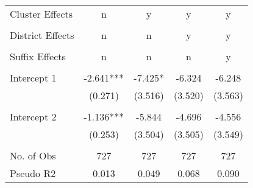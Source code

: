 \begin{tabular}{lcccc}
  Cluster Effects &                                 n &                                 y &                                 y &                                 y \\
                  &                                   &                                   &                                   &                                   \\
 District Effects &                                 n &                                 n &                                 y &                                 y \\
                  &                                   &                                   &                                   &                                   \\
   Suffix Effects &                                 n &                                 n &                                 n &                                 y \\
                  &                                   &                                   &                                   &                                   \\
      Intercept 1 &                         -2.641*** &                           -7.425* &                            -6.324 &                            -6.248 \\
                  &                           (0.271) &                           (3.516) &                           (3.520) &                           (3.563) \\
                  &                                   &                                   &                                   &                                   \\
      Intercept 2 &                         -1.136*** &                            -5.844 &                            -4.696 &                            -4.556 \\
                  &                           (0.253) &                           (3.504) &                           (3.505) &                           (3.549) \\
                  &                                   &                                   &                                   &                                   \\
       No. of Obs &                               727 &                               727 &                               727 &                               727 \\
        Pseudo R2 &                             0.013 &                             0.049 &                             0.068 &                             0.090 \\
\bottomrule
\end{tabular}
